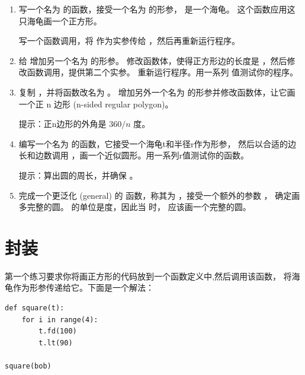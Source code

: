 \begin{enumerate}

\item 写一个名为  的函数，接受一个名为  的形参，  是一个海龟。 这个函数应用这只海龟画一个正方形。

写一个函数调用，将  作为实参传给  ，然后再重新运行程序。

\item 给  增加另一个名为  的形参。
 修改函数体，使得正方形边的长度是  ，然后修改函数调用，提供第二个实参。
 重新运行程序。用一系列  值测试你的程序。

\item 复制  ，并将函数改名为  。
   增加另外一个名为  的形参并修改函数体，让它画一个正 n 边形 (n-sided regular polygon)。

提示：正n边形的外角是 $360/n$ 度。

\item 编写一个名为  的函数，它接受一个海龟t和半径r作为形参， 然后以合适的边长和边数调用  ，画一个近似圆形。用一系列r值测试你的函数。

提示：算出圆的周长，并确保  。

\item 完成一个更泛化 (general) 的  函数，称其为  ，接受一个额外的参数  ， 确定画多完整的圆。  的单位是度，因此当  时，  应该画一个完整的圆。

  

\end{enumerate}


\section{封装}


第一个练习要求你将画正方形的代码放到一个函数定义中,然后调用该函数，
将海龟作为形参传递给它。下面是一个解法：

\begin{lstlisting}
def square(t):
    for i in range(4):
        t.fd(100)
        t.lt(90)

square(bob)
\end{lstlisting}


